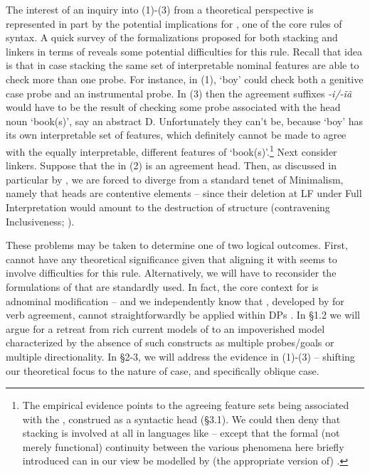 \documentclass[output=paper]{langsci/langscibook}
\begin{document}
The interest of an inquiry into (1)-(3) from a theoretical perspective is represented in part by the potential implications for , one of the core rules of  syntax. A quick survey of the formalizations proposed for both stacking and linkers in terms of  reveals some potential difficulties for this rule. Recall that  idea is that in case stacking the same set of interpretable nominal features are able to check more than one probe. For instance, in (1), ‘boy’ could check both a genitive case probe and an instrumental probe. In (3) then the agreement suffixes \textit{{}-}\textit{i/-ĩã} would have to be the result of checking some probe associated with the head noun ‘book(s)’, say an abstract D. Unfortunately they can’t be, because ‘boy’ has its own interpretable set of features, which definitely cannot be made to agree with the equally interpretable, different features of ‘book(s)’.\footnote{The empirical evidence points to the agreeing feature sets being associated with the , construed as a syntactic head (§3.1). We could then deny that stacking is involved at all in languages like  – except that the formal (not merely functional) continuity between the various phenomena here briefly introduced can in our view be modelled by (the appropriate version of) .} Next consider linkers. Suppose that the   in (2) is an agreement head. Then, as discussed in particular by \citet{Philip2012}, we are forced to diverge from a standard tenet of Minimalism, namely that heads are contentive elements – since their deletion at LF under Full Interpretation would amount to the destruction of structure (contravening Inclusiveness; \citealt{Chomsky1995}). 

These problems may be taken to determine one of two logical outcomes. First,  cannot have any theoretical significance given that aligning it with  seems to involve difficulties for this rule. Alternatively, we will have to reconsider the formulations of  that are standardly used. In fact, the core context for  is adnominal modification – and we independently know that  , developed by \citet{Chomsky2000,Chomsky2001Derivation} for verb agreement, cannot straightforwardly be applied within DPs \citep{Carstens2001}. In §1.2 we will argue for a retreat from rich current models of  to an impoverished model characterized by the absence of such constructs as multiple probes\slash goals or multiple directionality. In §2-3, we will address the evidence in (1)-(3) – shifting our theoretical focus to the nature of case, and specifically oblique case.
\end{document}
